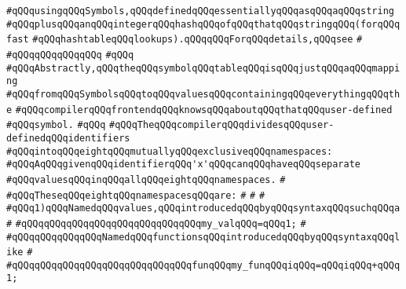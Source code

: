 \verb|#qQQqusingqQQqSymbols,qQQqdefinedqQQqessentiallyqQQqasqQQqaqQQqstring|\newline
\verb|#qQQqplusqQQqanqQQqintegerqQQqhashqQQqofqQQqthatqQQqstringqQQq(forqQQqfast|\newline
\verb|#qQQqhashtableqQQqlookups).qQQqqQQqForqQQqdetails,qQQqsee|\newline
\verb|#|\newline
\verb|#qQQqqQQqqQQqqQQq|\newline
\verb|#qQQq|\newline
\verb|#qQQqAbstractly,qQQqtheqQQqsymbolqQQqtableqQQqisqQQqjustqQQqaqQQqmapping|\newline
\verb|#qQQqfromqQQqSymbolsqQQqtoqQQqvaluesqQQqcontainingqQQqeverythingqQQqthe|\newline
\verb|#qQQqcompilerqQQqfrontendqQQqknowsqQQqaboutqQQqthatqQQquser-defined|\newline
\verb|#qQQqsymbol.|\newline
\verb|#qQQq|\newline
\verb|#qQQqTheqQQqcompilerqQQqdividesqQQquser-definedqQQqidentifiers|\newline
\verb|#qQQqintoqQQqeightqQQqmutuallyqQQqexclusiveqQQqnamespaces:|\newline
\verb|#qQQqAqQQqgivenqQQqidentifierqQQq'x'qQQqcanqQQqhaveqQQqseparate|\newline
\verb|#qQQqvaluesqQQqinqQQqallqQQqeightqQQqnamespaces.|\newline
\verb|#|\newline
\verb|#qQQqTheseqQQqeightqQQqnamespacesqQQqare:|\newline
\verb|#|\newline
\verb|#|\newline
\verb|#|\newline
\verb|#qQQq1)qQQqNamedqQQqvalues,qQQqintroducedqQQqbyqQQqsyntaxqQQqsuchqQQqa|\newline
\verb|#|\newline
\verb|#qQQqqQQqqQQqqQQqqQQqqQQqqQQqqQQqmy_valqQQq=qQQq1;|\newline
\verb|#|\newline
\verb|#qQQqqQQqqQQqqQQqNamedqQQqfunctionsqQQqintroducedqQQqbyqQQqsyntaxqQQqlike|\newline
\verb|#|\newline
\verb|#qQQqqQQqqQQqqQQqqQQqqQQqqQQqqQQqfunqQQqmy_funqQQqiqQQq=qQQqiqQQq+qQQq1;|\newline
